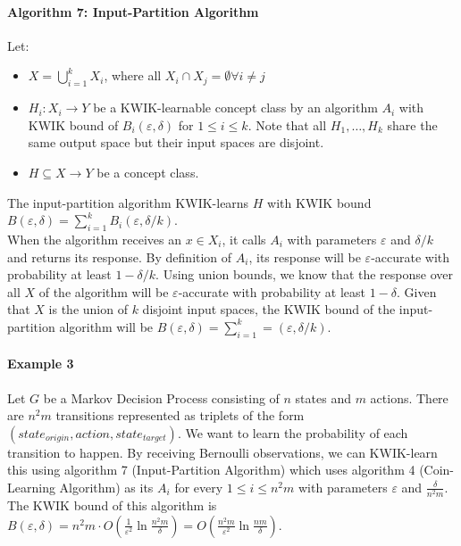 \paragraph{Algorithm 7: Input-Partition Algorithm}
Let:
\begin{itemize}
  \item $X = \bigcup_{i=1}^k X_i$, where all $X_i \cap X_j = \emptyset \forall i \neq j$
  \item $H_i: X_i \to Y$ be a KWIK-learnable concept class by an algorithm $A_i$
  with KWIK bound of $B_i(\varepsilon, \delta)$ for $1 \leq i \leq k$. Note
  that all $H_1, \ldots, H_k$ share the same output space but their input spaces
  are disjoint.
  \item $H \subseteq X \to Y$ be a concept class.
\end{itemize}

The input-partition algorithm KWIK-learns $H$ with KWIK bound $B(\varepsilon,
\delta) = \sum_{i=1}^k B_i(\varepsilon, \delta/k)$. \\

When the algorithm receives an $x \in X_i$, it calls $A_i$ with parameters
$\varepsilon$ and $\delta/k$ and returns its response. By definition of $A_i$,
its response will be $\varepsilon$-accurate with probability at least $1 -
\delta/k$. Using union bounds, we know that the response over all $X$ of the
algorithm will be $\varepsilon$-accurate with probability at least $1 - \delta$.
Given that $X$ is the union of $k$ disjoint input spaces, the KWIK bound
of the input-partition algorithm will be $B(\varepsilon, \delta) = \sum_{i=1}^k
= (\varepsilon, \delta/k)$.

\paragraph{Example 3} Let $G$ be a Markov Decision Process consisting of $n$
states and $m$ actions. There are $n^2m$ transitions represented as triplets of
the form $(state_{origin}, action, state_{target})$. We want to learn the
probability of each transition to happen. By receiving Bernoulli observations,
we can KWIK-learn this using algorithm 7 (Input-Partition Algorithm) which
uses algorithm 4 (Coin-Learning Algorithm) as its $A_i$ for every $1 \leq i \leq
n^2m$ with parameters $\varepsilon$ and $\frac{\delta}{n^2m}$. The KWIK bound of
this algorithm is $B(\varepsilon, \delta) = n^2m \cdot O(\frac{1}{\varepsilon^2}
\ln \frac{n^2m}{\delta}) = O(\frac{n^2m}{\varepsilon^2} \ln \frac{nm}{\delta})$.
